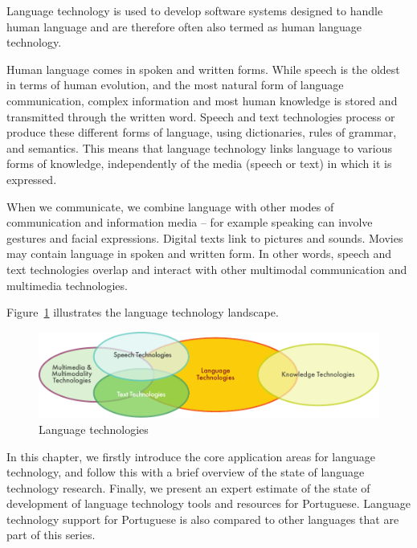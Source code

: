 \clearpage


\begin{multicols}{2}

Language technology is used to develop software systems designed to handle human language and are therefore often also termed as human language technology. 

Human language comes in spoken and written forms. 
While speech is the oldest  in terms of human evolution, and the most natural form of language communication, 
complex information and most human knowledge is stored and transmitted through the written word. 
Speech and text technologies process or produce these different forms of language, using dictionaries, rules of grammar, and semantics. 
This means that language technology links language to various forms of knowledge, independently of the media (speech or text) in which it is expressed. 

When we communicate, we combine language with other modes of communication and information media -- for example speaking 
can involve gestures and facial expressions. Digital texts link to pictures and sounds. 
Movies may contain language in spoken and written form. In other words, speech and text technologies overlap 
and interact with other multimodal communication and multimedia technologies.

Figure~\ref{fig:ltincontext_en} illustrates the language technology landscape.

\begin{figure}[htb]
  \center
  \includegraphics[width=\textwidth]{../_media/english/language_technologies}
  \caption{Language technologies}
  \label{fig:ltincontext_en}
\end{figure}

In this chapter, we firstly introduce the core application areas for language technology, and follow this with a brief overview of the state of language technology research. Finally, we present an expert estimate of the state of development of language technology tools and resources for Portuguese. 
Language technology support for Portuguese is also compared to other languages that are part of this series.



\end{multicols}
